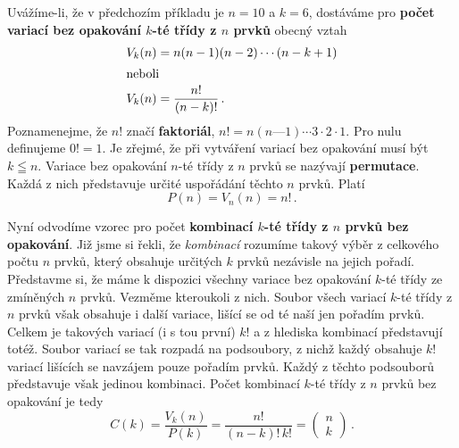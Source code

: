 {      %
      
      
      Uvážíme-li, že v předchozím příkladu je \(n = 10\) a \(k = 6\), dostáváme pro \textbf{počet 
      variací bez opakování \(k\)-té třídy z \(n\) prvků} obecný vztah
      \begin{align}
        V_k(n) &= n(n-1)(n-2)\cdots(n-k+1)  \nonumber \\
        \shortintertext{neboli}
        V_k(n) &= \frac{n!}{(n-k)!}\, .    \label{mai:eq008}
      \end{align}
      Poznamenejme, že \(n!\) značí \textbf{faktoriál}, \(n! = n(n — 1)\cdots 3 \cdot 2 \cdot 1\). 
      Pro nulu definujeme \(0! = 1\). Je zřejmé, že při vytváření variací bez opakování musí být 
      \(k\leqq n\). Variace bez opakování \(n\)-té třídy z \(n\) prvků se nazývají 
      \textbf{permutace}. Každá z nich představuje určité uspořádání těchto \(n\) prvků. Platí
      \begin{equation}\label{mai:eq009}
        \boxed{P(n) = V_n(n) = n!}\, .
      \end{equation}
      
      Nyní odvodíme vzorec pro počet \textbf{kombinací \(k\)-té třídy z \(n\) prvků bez opakování}. 
      Již jsme si řekli, že \emph{kombinací} rozumíme takový výběr z celkového počtu \(n\) prvků, 
      který obsahuje určitých \(k\) prvků nezávisle na jejich pořadí. Představme si, že máme k 
      dispozici všechny variace bez opakování \(k\)-té třídy ze zmíněných \(n\) prvků. Vezměme 
      kteroukoli z nich. Soubor všech variací \(k\)-té třídy z \(n\) prvků však obsahuje i další 
      variace, lišící se od té naší jen pořadím prvků. Celkem je takových variací (i s tou první) 
      \(k!\) a z hlediska kombinací představují totéž. Soubor variací se tak rozpadá na podsoubory, 
      z nichž každý obsahuje \(k!\) variací lišících se navzájem pouze pořadím prvků. Každý z 
      těchto podsouborů představuje však jedinou kombinaci. Počet kombinací \(k\)-té třídy z \(n\) 
      prvků bez opakování je tedy
      \begin{equation}\label{mai:eq010}
        \boxed{C(k) = \frac{V_k(n)}{P(k)} = \frac{n!}{(n-k)!\,k!} = 
               \begin{pmatrix}
                n \\
                k
               \end{pmatrix}}\, .
      \end{equation}
      
}

